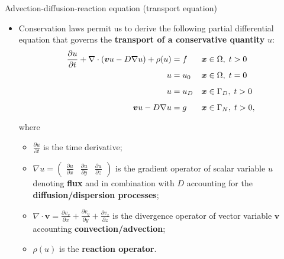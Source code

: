 \begin{frame}{Advection-diffusion-reaction equation (transport equation)}
\begin{itemize}
\item Conservation laws permit us to derive the following partial differential
equation that governs the {\bf transport of a conservative quantity} $u$:
%
{
	\small
	\begin{align*}
		\frac{\partial u}{\partial t}+\nabla\cdot(\boldsymbol{v}u-D\nabla u) + \rho (u) & =f &  & \boldsymbol{x}\in\Omega,\;t>0\\[-5pt]
		u & =u_{0} & \vphantom{\frac{\partial u}{\partial t}} & \boldsymbol{x}\in\Omega,\;t=0\\[-5pt]
		u & =u_{D} & \vphantom{\frac{\partial u}{\partial t}} & \boldsymbol{x}\in\Gamma_{D},\;t>0\\[-5pt]
		\boldsymbol{v}u-D\nabla u & =g & \vphantom{\frac{\partial u}{\partial t}} & \boldsymbol{x}\in\Gamma_{N},\;t>0,
	\end{align*}
}
%
where \\[5pt]
%
\begin{itemize}
	\item $\frac{\partial u}{\partial t}$ is the time derivative;\\[2pt]
	\item $\nabla u = \begin{pmatrix}\tfrac{\partial u}{\partial x} & \tfrac{\partial u}{\partial y} & \tfrac{\partial u}{\partial z}\end{pmatrix} $ is the \alert{gradient operator} of scalar variable $u$ denoting \alert{\bf flux} and in combination with $D$ accounting for the \alert{\bf diffusion/dispersion processes}; \\[2pt]
	\item $\nabla\cdot\boldsymbol{v} =\tfrac{\partial v_{x}}{\partial x}+\tfrac{\partial v_{y}}{\partial y}+\tfrac{\partial v_{z}}{\partial z}$ is the \alert{divergence operator} of vector
	variable $\boldsymbol{v}$ accounting \alert{\bf convection/advection};\\[2pt]
	\item $\rho (u)$ is the \alert{\bf reaction operator}. 
\end{itemize}
\end{itemize}
\end{frame}
%
